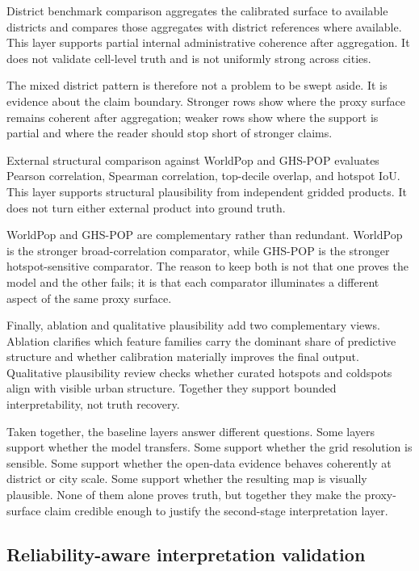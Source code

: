 District benchmark comparison aggregates the calibrated surface to available districts and compares those aggregates with district references where available. This layer supports partial internal administrative coherence after aggregation. It does not validate cell-level truth and is not uniformly strong across cities.

The mixed district pattern is therefore not a problem to be swept aside. It is evidence about the claim boundary. Stronger rows show where the proxy surface remains coherent after aggregation; weaker rows show where the support is partial and where the reader should stop short of stronger claims.

External structural comparison against WorldPop and GHS-POP evaluates Pearson correlation, Spearman correlation, top-decile overlap, and hotspot IoU. This layer supports structural plausibility from independent gridded products. It does not turn either external product into ground truth.

WorldPop and GHS-POP are complementary rather than redundant. WorldPop is the stronger broad-correlation comparator, while GHS-POP is the stronger hotspot-sensitive comparator. The reason to keep both is not that one proves the model and the other fails; it is that each comparator illuminates a different aspect of the same proxy surface.

Finally, ablation and qualitative plausibility add two complementary views. Ablation clarifies which feature families carry the dominant share of predictive structure and whether calibration materially improves the final output. Qualitative plausibility review checks whether curated hotspots and coldspots align with visible urban structure. Together they support bounded interpretability, not truth recovery.

Taken together, the baseline layers answer different questions. Some layers support whether the model transfers. Some support whether the grid resolution is sensible. Some support whether the open-data evidence behaves coherently at district or city scale. Some support whether the resulting map is visually plausible. None of them alone proves truth, but together they make the proxy-surface claim credible enough to justify the second-stage interpretation layer.

\subsection{Reliability-aware interpretation validation}

